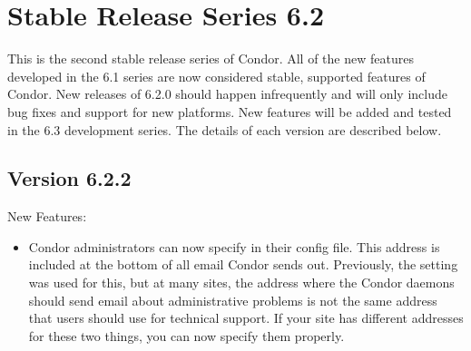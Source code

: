 \section{\label{sec:History-6-2}Stable Release Series 6.2}

This is the second stable release series of Condor.
All of the new features developed in the 6.1 series are now considered
stable, supported features of Condor.
New releases of 6.2.0 should happen infrequently and will only include
bug fixes and support for new platforms.
New features will be added and tested in the 6.3 development series. 
The details of each version are described below.


\subsection{\label{sec:New-6-2-2}Version 6.2.2}
\noindent New Features:
\begin{itemize}

\item Condor administrators can now specify
 in their config file.
This address is included at the bottom of all email Condor sends out.
Previously, the  setting was used for this, but
at many sites, the address where the Condor daemons should send email
about administrative problems is not the same address that users
should use for technical support.
If your site has different addresses for these two things, you can now
specify them properly.

\end{itemize}

